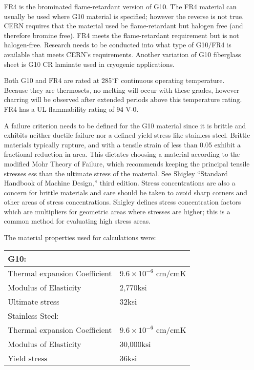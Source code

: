 FR4 is the brominated flame-retardant version of G10. The FR4 material can usually be used where G10 material is specified; however  
the reverse is not true. CERN requires that the material used be flame-retardant but halogen free (and therefore bromine free).  FR4 meets the flame-retardant requirement but 
is not halogen-free. Research needs to be conducted into what type of G10/FR4 is available that meets CERN's requirements.
Another variation of G10 fiberglass sheet is G10 CR laminate used in cryogenic applications. 

Both G10 and FR4 are rated at 285$^\circ$F continuous operating temperature. Because they are thermosets, no melting will occur with these grades, however charring will be observed after extended periods above this temperature rating. FR4 has a UL flammability rating of 94 V-0.


A failure criterion needs to be defined for the G10 material since it is brittle and exhibits neither ductile failure nor a defined yield stress like stainless steel.  Brittle materials typically rupture, and with a tensile strain of less than 0.05 exhibit a fractional reduction in area.  This dictates choosing a material according to 
the modified Mohr Theory of Failure, which recommends keeping the principal tensile stresses ess than the ultimate stress of the material.  See Shigley ``Standard Handbook of Machine Design,'' third edition.   Stress concentrations are also a concern for brittle materials and care should be taken to avoid sharp corners and other areas of stress concentrations.  Shigley defines stress concentration factors which are multipliers for geometric areas where stresses are higher; this is a common method for evaluating high stress areas.  


The material properties used for calculations were:

\begin{tabular}{l l}
G10: 	& \\
\hline
Thermal expansion Coefficient	&	$9.6 \times 10^{-6}$ cm/cmK	\\
Modulus of Elasticity			&	2,770ksi				\\
\vspace{0.5em}Ultimate stress				&	32ksi				\\
Stainless Steel: & \\
\hline
Thermal expansion Coefficient	&	$9.6 \times 10^{-6}$ cm/cmK	\\
Modulus of Elasticity			&	30,000ksi				\\
Yield stress					&	36ksi				\\
\end{tabular}

